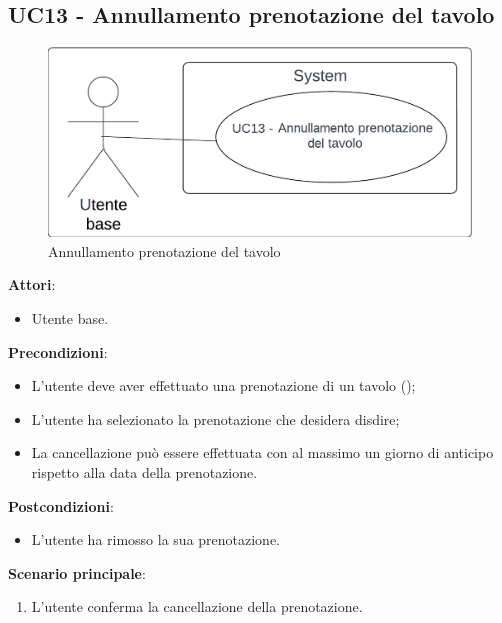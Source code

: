 \subsection{UC13 - Annullamento prenotazione del tavolo} \label{usecase:13}
\begin{figure}[H]
\centering
\includegraphics[width=0.75\linewidth]{ucd/ucd13.png}
\caption{Annullamento prenotazione del tavolo}
\end{figure}
\textbf{Attori}:
\begin{itemize}
    \item Utente base.
\end{itemize}
\textbf{Precondizioni}:
\begin{itemize}
    \item L'utente deve aver effettuato una prenotazione di un tavolo ();
    \item L'utente ha selezionato la prenotazione che desidera disdire;
    \item La cancellazione può essere effettuata con al massimo un giorno di anticipo rispetto alla data della prenotazione.
\end{itemize}
\textbf{Postcondizioni}:
\begin{itemize}
    \item L'utente ha rimosso la sua prenotazione.
\end{itemize}
\textbf{Scenario principale}:
\begin{enumerate}
    \item L'utente conferma la cancellazione della prenotazione.
\end{enumerate}
\newpage
